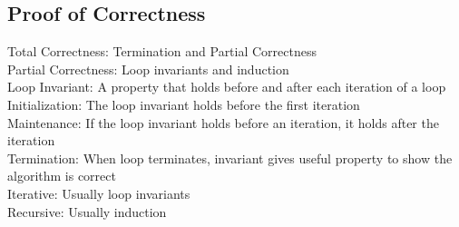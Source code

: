 \documentclass{article}
\author{Ian Chen}
\date{\today}
\begin{document}
    \begin{multicols*}{2}
        \subsection*{Proof of Correctness}
        Total Correctness: Termination and Partial Correctness\\
        Partial Correctness: Loop invariants and induction\\
        Loop Invariant: A property that holds before and after each iteration of a loop\\
        Initialization: The loop invariant holds before the first iteration\\
        Maintenance: If the loop invariant holds before an iteration, it holds after the iteration\\
        Termination: When loop terminates, invariant gives useful property to show the algorithm is
        correct\\
        Iterative: Usually loop invariants\\
        Recursive: Usually induction

\end{multicols*}
\end{document}
